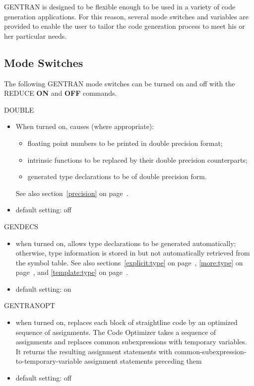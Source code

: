 GENTRAN is designed to be flexible enough to be used in a variety of
code generation applications.  For this reason, several mode
switches and variables are provided to enable the user to tailor the
code generation process to meet his or her particular needs.

\subsection{Mode Switches}
The following GENTRAN mode switches can be turned on and off with the
REDUCE {\bf ON} and {\bf OFF} commands.

\begin{describe}{DOUBLE}
 
\begin{itemize}
\item When turned on, causes (where appropriate):
\begin{itemize}
\item floating point numbers to be printed in double precision format;
\item intrinsic functions to be replaced by their double precision
counterparts;
\item generated type declarations to be of double precision form.
\end{itemize}
See also section~\ref{precision} on page~\pageref{precision}.
\item default setting: off
\end{itemize}
\end{describe}

\begin{describe}{GENDECS}
\begin{itemize}
\item when turned on, allows type declarations to be generated automatically;
otherwise, type information is stored in but not automatically retrieved
from the symbol table.  See also sections~\ref{explicit:type} on
page~\pageref{explicit:type}, \ref{more:type} on page~\pageref{more:type},
and \ref{template:type} on page~\pageref{template:type}.
\item default setting:  on
\end{itemize}
\end{describe}

\begin{describe}{GENTRANOPT}
\begin{itemize}
\item when turned on, replaces each block of straightline code by
an optimized sequence of assignments.
The Code Optimizer takes a sequence of assignments and replaces common
subexpressions with temporary variables.  It returns the resulting assignment
statements with common-subexpression-to-temporary-variable assignment
statements preceding them
\item default setting:  off
\end{itemize}
\end{describe}

